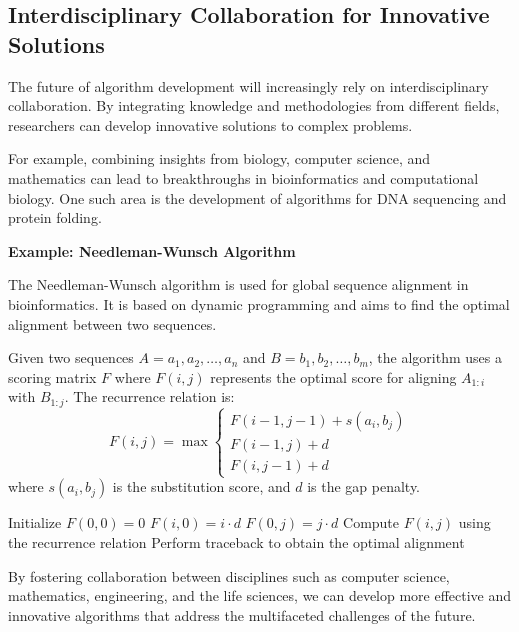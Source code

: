 \documentclass[12pt]{book} %
\begin{document}
\subsection{Interdisciplinary Collaboration for Innovative Solutions}
The future of algorithm development will increasingly rely on interdisciplinary collaboration. By integrating knowledge and methodologies from different fields, researchers can develop innovative solutions to complex problems.

For example, combining insights from biology, computer science, and mathematics can lead to breakthroughs in bioinformatics and computational biology. One such area is the development of algorithms for DNA sequencing and protein folding.

\textbf{Example: Needleman-Wunsch Algorithm}

The Needleman-Wunsch algorithm is used for global sequence alignment in bioinformatics. It is based on dynamic programming and aims to find the optimal alignment between two sequences.

Given two sequences \(A = a_1, a_2, \ldots, a_n\) and \(B = b_1, b_2, \ldots, b_m\), the algorithm uses a scoring matrix \(F\) where \(F(i, j)\) represents the optimal score for aligning \(A_{1:i}\) with \(B_{1:j}\). The recurrence relation is:
\[
F(i, j) = \max
\begin{cases}
F(i-1, j-1) + s(a_i, b_j) \\
F(i-1, j) + d \\
F(i, j-1) + d
\end{cases}
\]
where \(s(a_i, b_j)\) is the substitution score, and \(d\) is the gap penalty.
\FloatBarrier
\begin{algorithm}
\caption{Needleman-Wunsch Algorithm}
\begin{algorithmic}[1]
\State Initialize \(F(0, 0) = 0\)
    \State \(F(i, 0) = i \cdot d\)
\EndFor
{}
    \State \(F(0, j) = j \cdot d\)
\EndFor
{}
    \State Compute \(F(i, j)\) using the recurrence relation
\EndFor
\State Perform traceback to obtain the optimal alignment
\end{algorithmic}
\end{algorithm}
\FloatBarrier
By fostering collaboration between disciplines such as computer science, mathematics, engineering, and the life sciences, we can develop more effective and innovative algorithms that address the multifaceted challenges of the future.
\end{document}
